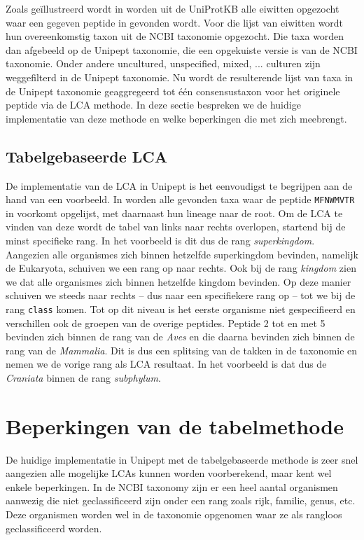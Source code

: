 Zoals geïllustreerd wordt in  worden uit de UniProtKB alle
eiwitten opgezocht waar een gegeven peptide in gevonden wordt. Voor die lijst
van eiwitten wordt hun overeenkomstig taxon uit de NCBI taxonomie opgezocht.
Die taxa worden dan afgebeeld op de Unipept taxonomie, die een opgekuiste versie
is van de NCBI taxonomie. Onder andere uncultured, unspecified, mixed, ...
culturen zijn weggefilterd in de Unipept taxonomie. Nu wordt de resulterende
lijst van taxa in de Unipept taxonomie geaggregeerd tot één consensustaxon voor
het originele peptide via de LCA methode. In deze sectie bespreken we de huidige
implementatie van deze methode en welke beperkingen die met zich meebrengt.

\subsection{Tabelgebaseerde LCA}
De implementatie van de LCA in Unipept is het eenvoudigst te begrijpen aan de 
hand van een voorbeeld. In  worden alle gevonden taxa 
waar de peptide \texttt{MFNWMVTR} in voorkomt opgelijst, met daarnaast hun 
lineage naar de root. Om de LCA te vinden van deze wordt de tabel van links 
naar rechts overlopen, startend bij de minst specifieke rang. In het voorbeeld 
is dit dus de rang \textit{superkingdom}. Aangezien alle organismes zich 
binnen hetzelfde superkingdom bevinden, namelijk de Eukaryota, schuiven we een 
rang op naar rechts. Ook bij de rang \textit{kingdom} zien we dat alle 
organismes zich binnen hetzelfde kingdom bevinden. Op deze manier schuiven we 
steeds naar rechts -- dus naar een specifiekere rang op -- tot we bij de rang 
\texttt{class} komen. Tot op dit niveau is het eerste organisme niet 
gespecifieerd en verschillen ook de groepen van de overige peptides. Peptide 2 
tot en met 5 bevinden zich binnen de rang van de \textit{Aves} en die daarna 
bevinden zich binnen de rang van de \textit{Mammalia}. Dit is dus een 
splitsing van de takken in de taxonomie en nemen we de vorige rang als LCA 
resultaat. In het voorbeeld is dat dus de \textit{Craniata} binnen de rang 
\textit{subphylum}.

\section{Beperkingen van de tabelmethode}
De huidige implementatie in Unipept met de tabelgebaseerde methode is zeer snel
aangezien alle mogelijke LCAs kunnen worden voorberekend, maar kent wel enkele
beperkingen. In de NCBI taxonomy zijn er een heel aantal organismen aanwezig die
niet geclassificeerd zijn onder een rang zoals rijk, familie, genus, etc. Deze
organismen worden wel in de taxonomie opgenomen waar ze als rangloos
geclassificeerd worden.

